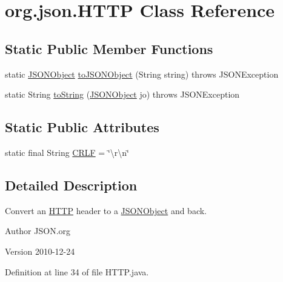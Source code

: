 \hypertarget{classorg_1_1json_1_1_h_t_t_p}{\section{org.\-json.\-H\-T\-T\-P Class Reference}
\label{classorg_1_1json_1_1_h_t_t_p}
}
\subsection*{Static Public Member Functions}
\begin{DoxyCompactItemize}
\item 
static \hyperlink{classorg_1_1json_1_1_j_s_o_n_object}{J\-S\-O\-N\-Object} \hyperlink{classorg_1_1json_1_1_h_t_t_p_a9ac2cf295e6a84bfeed1af10dc9dae33}{to\-J\-S\-O\-N\-Object} (String string)  throws J\-S\-O\-N\-Exception 
\item 
static String \hyperlink{classorg_1_1json_1_1_h_t_t_p_aee0416336b82e1c7c7941350a2a409d7}{to\-String} (\hyperlink{classorg_1_1json_1_1_j_s_o_n_object}{J\-S\-O\-N\-Object} jo)  throws J\-S\-O\-N\-Exception 
\end{DoxyCompactItemize}
\subsection*{Static Public Attributes}
\begin{DoxyCompactItemize}
\item 
static final String \hyperlink{classorg_1_1json_1_1_h_t_t_p_a7feb3304ccde0415ee29b8f997fb65b6}{C\-R\-L\-F} = \char`\"{}\textbackslash{}r\textbackslash{}n\char`\"{}
\end{DoxyCompactItemize}


\subsection{Detailed Description}
Convert an \hyperlink{classorg_1_1json_1_1_h_t_t_p}{H\-T\-T\-P} header to a \hyperlink{classorg_1_1json_1_1_j_s_o_n_object}{J\-S\-O\-N\-Object} and back. \begin{DoxyAuthor}{Author}
J\-S\-O\-N.\-org 
\end{DoxyAuthor}
\begin{DoxyVersion}{Version}
2010-\/12-\/24 
\end{DoxyVersion}


Definition at line 34 of file H\-T\-T\-P.\-java.



